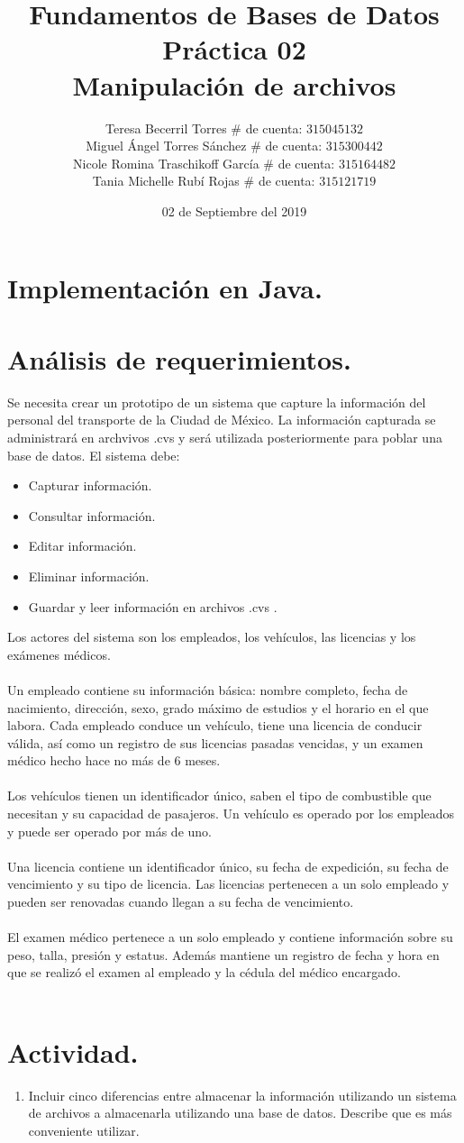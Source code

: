 \documentclass[letterpaper,12pt]{article}
\title{Fundamentos de Bases de Datos \\
        Práctica 02 \\
        Manipulación de archivos}
\author{Teresa Becerril Torres
            $\#$ de cuenta: $315045132$ \\
            Miguel Ángel Torres Sánchez
            $\#$ de cuenta: $315300442$ \\
            Nicole Romina Traschikoff García
            $\#$ de cuenta: $315164482$ \\
            Tania Michelle Rubí Rojas
            $\#$ de cuenta: $315121719$}
\date{02 de Septiembre del 2019}
\begin{document}
    \maketitle

    \section{Implementación en Java.}
    \section{Análisis de requerimientos.}
	Se necesita crear un prototipo de un sistema que capture la información del personal del transporte de la Ciudad de México. La información capturada se administrará en archvivos .cvs y será utilizada posteriormente para poblar una base de datos. El sistema debe:
	\begin{itemize}
		\item Capturar información.
		\item Consultar información.
		\item Editar información.
		\item Eliminar información.
		\item Guardar y leer información en archivos .cvs .
	\end{itemize}

	Los actores del sistema son los empleados, los vehículos, las licencias y los exámenes médicos.\\ \\
	Un empleado contiene su información básica: nombre completo, fecha de nacimiento, dirección, sexo, grado máximo de estudios y el horario en el que labora. Cada empleado conduce un vehículo, tiene una licencia de conducir válida, así como un registro de sus licencias pasadas vencidas, y un examen médico hecho hace no más de 6 meses.
	\\ \\
	Los vehículos tienen un identificador único, saben el tipo de combustible que necesitan y su capacidad de pasajeros. Un vehículo es operado por los empleados y puede ser operado por más de uno.
	\\ \\
	Una licencia contiene un identificador único, su fecha de expedición, su fecha de vencimiento y su tipo de licencia. Las licencias pertenecen a un solo empleado y pueden ser renovadas cuando llegan a su fecha de vencimiento.
	\\ \\
	El examen médico pertenece a un solo empleado y contiene información sobre su peso, talla, presión y estatus. Además mantiene un registro de fecha y hora en que se realizó el examen al empleado y la cédula del médico encargado.
	\\ \\

    \section{Actividad.}
      \begin{enumerate}
        \item Incluir cinco diferencias entre almacenar la información utilizando un sistema de archivos a almacenarla utilizando una base de datos. Describe que es más conveniente utilizar.
      \end{enumerate}


            
\end{document}
